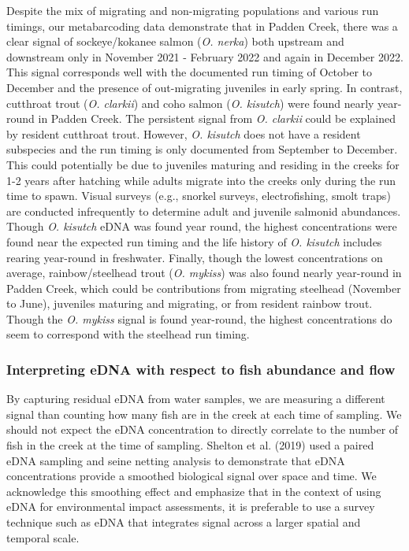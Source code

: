 \documentclass[
]{article}
\begin{document}
Despite the mix of migrating and non-migrating populations and various
run timings, our metabarcoding data demonstrate that in Padden Creek,
there was a clear signal of sockeye/kokanee salmon (\emph{O. nerka})
both upstream and downstream only in November 2021 - February 2022 and
again in December 2022. This signal corresponds well with the documented
run timing of October to December and the presence of out-migrating
juveniles in early spring. In contrast, cutthroat trout (\emph{O.
clarkii}) and coho salmon (\emph{O. kisutch}) were found nearly
year-round in Padden Creek. The persistent signal from \emph{O. clarkii}
could be explained by resident cutthroat trout. However, \emph{O.
kisutch} does not have a resident subspecies and the run timing is only
documented from September to December. This could potentially be due to
juveniles maturing and residing in the creeks for 1-2 years after
hatching while adults migrate into the creeks only during the run time
to spawn. Visual surveys (e.g., snorkel surveys, electrofishing, smolt
traps) are conducted infrequently to determine adult and juvenile
salmonid abundances. Though \emph{O. kisutch} eDNA was found year round,
the highest concentrations were found near the expected run timing and
the life history of \emph{O. kisutch} includes rearing year-round in
freshwater. Finally, though the lowest concentrations on average,
rainbow/steelhead trout (\emph{O. mykiss}) was also found nearly
year-round in Padden Creek, which could be contributions from migrating
steelhead (November to June), juveniles maturing and migrating, or from
resident rainbow trout. Though the \emph{O. mykiss} signal is found
year-round, the highest concentrations do seem to correspond with the
steelhead run timing.

\hypertarget{interpreting-edna-with-respect-to-fish-abundance-and-flow}{%
\subsubsection{Interpreting eDNA with respect to fish abundance and
flow}\label{interpreting-edna-with-respect-to-fish-abundance-and-flow}}

By capturing residual eDNA from water samples, we are measuring a
different signal than counting how many fish are in the creek at each
time of sampling. We should not expect the eDNA concentration to
directly correlate to the number of fish in the creek at the time of
sampling. Shelton et al. (2019) used a paired eDNA sampling and seine
netting analysis to demonstrate that eDNA concentrations provide a
smoothed biological signal over space and time. We acknowledge this
smoothing effect and emphasize that in the context of using eDNA for
environmental impact assessments, it is preferable to use a survey
technique such as eDNA that integrates signal across a larger spatial
and temporal scale.
\end{document}
